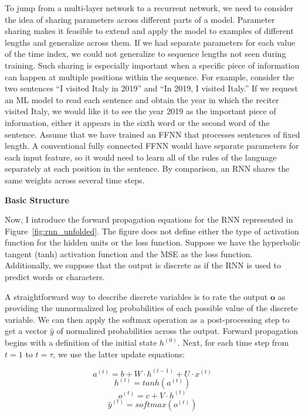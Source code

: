 To jump from a multi-layer network to a recurrent network, we need to consider the idea of sharing parameters across different parts of a model.
Parameter sharing makes it feasible to extend and apply the model to examples of different lengths and generalize across them.
If we had separate parameters for each value of the time index, we could not generalize to sequence lengths not seen during training.
Such sharing is especially important when a specific piece of information can happen at multiple positions within the sequence.
For example, consider the two sentences “I visited Italy in 2019” and “In 2019, I visited Italy.”
If we request an ML model to read each sentence and obtain the year in which the reciter visited Italy, we would like it to see
the year 2019 as the important piece of information, either it appears in the sixth word or the second word of the sentence.
Assume that we have trained an FFNN that processes sentences of fixed length.
A conventional fully connected FFNN would have separate parameters for each input feature, so it would need to learn
all of the rules of the language separately at each position in the sentence.
By comparison, an RNN shares the same weights across several time steps.


{\large \textbf{Basic Structure}}

Now, I introduce the forward propagation equations for the RNN represented in Figure~\ref{fig:rnn_unfolded}.
The figure does not define either the type of activation function for the hidden units or the loss function.
Suppose we have the hyperbolic tangent (tanh) activation function and the MSE as the loss function.
Additionally, we suppose that the output is discrete as if the RNN is used to predict words or characters.

A straightforward way to describe discrete variables is to rate the output $\textbf{o}$ as providing the unnormalized log
probabilities of each possible value of the discrete variable.
We can then apply the softmax operation as a post-processing step to get a vector $\hat{y}$ of normalized probabilities across the output.
Forward propagation begins with a definition of the initial state $h^{(0)}$.
Next, for each time step from $t=1$ to $t=\tau$, we use the latter update equations:

\begin{equation}
    a^{(t)} = b + W \cdot h^{(t-1)} + U \cdot x^{(t)}\label{eq:equation6}
\end{equation}
\begin{equation}
    h^{(t)} = tanh(a^{(t)})\label{eq:equation7}
\end{equation}
\begin{equation}
    o^{(t)} = c + V \cdot h^{(t)}\label{eq:equation9}
\end{equation}
\begin{equation}
    \hat{y}^{(t)} = softmax(o^{(t)})\label{eq:equation8}
\end{equation}

